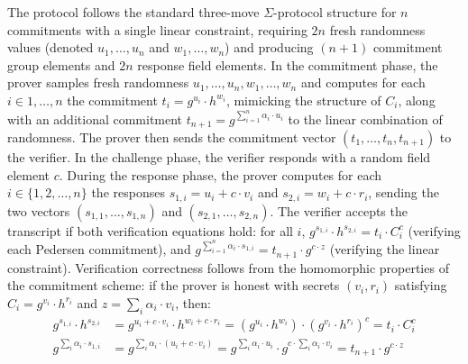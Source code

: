 \documentclass[sigconf, anonymous]{acmart}
\begin{document}
The protocol follows the standard three-move $\Sigma$-protocol structure for $n$ commitments with a single linear constraint, requiring $2n$ fresh randomness values (denoted $u_1, \ldots, u_n$ and $w_1, \ldots, w_n$) and producing $(n+1)$ commitment group elements and $2n$ response field elements. In the commitment phase, the prover samples fresh randomness $u_1, \ldots, u_n, w_1, \ldots, w_n$ and computes for each $i \in {1, \ldots, n}$ the commitment $t_i = g^{u_i} \cdot h^{w_i}$, mimicking the structure of $C_i$, along with an additional commitment $t_{n+1} = g^{\sum_{i=1}^{n} \alpha_i \cdot u_i}$ to the linear combination of randomness. The prover then sends the commitment vector $(t_1, \ldots, t_n, t_{n+1})$ to the verifier. In the challenge phase, the verifier responds with a random field element $c$. During the response phase, the prover computes for each $i \in \{1, 2, \dots, n\}$ the responses $s_{1,i} = u_i + c \cdot v_i$ and $s_{2,i} = w_i + c \cdot r_i$, sending the two vectors $(s_{1,1}, \ldots, s_{1,n})$ and $(s_{2,1}, \ldots, s_{2,n})$. The verifier accepts the transcript if both verification equations hold: for all $i$, $g^{s_{1,i}} \cdot h^{s_{2,i}} = t_i \cdot C_i^c$ (verifying each Pedersen commitment), and $g^{\sum_{i=1}^{n} \alpha_i \cdot s_{1,i}} = t_{n+1} \cdot g^{c \cdot z}$ (verifying the linear constraint). Verification correctness follows from the homomorphic properties of the commitment scheme: if the 
prover is honest with secrets $(v_i, r_i)$ satisfying $C_i = g^{v_i} \cdot h^{r_i}$ and 
$z = \sum_i \alpha_i \cdot v_i$, then:
\begin{align*}
g^{s_{1,i}} \cdot h^{s_{2,i}} &= g^{u_i + c \cdot v_i} \cdot h^{w_i + c \cdot r_i} = 
(g^{u_i} \cdot h^{w_i}) \cdot (g^{v_i} \cdot h^{r_i})^c = t_i \cdot C_i^c \\
g^{\sum_i \alpha_i \cdot s_{1,i}} &= g^{\sum_i \alpha_i \cdot (u_i + c \cdot v_i)} = 
g^{\sum_i \alpha_i \cdot u_i} \cdot g^{c \cdot \sum_i \alpha_i \cdot v_i} = t_{n+1} \cdot g^{c \cdot z}
\end{align*}
\end{document}
